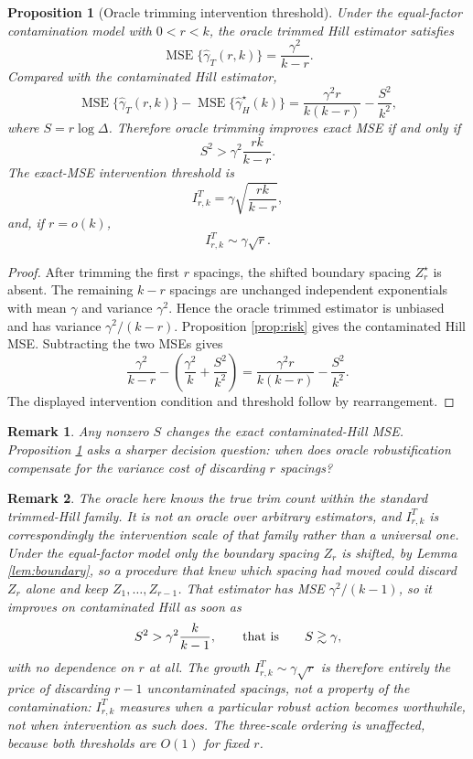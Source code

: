 \documentclass[11pt]{article}
\newtheorem{proposition}{Proposition}
\newtheorem{remark}{Remark}
\newcommand{\ghat}{\widehat{\gamma}}
\begin{document}
\begin{proposition}[Oracle trimming intervention threshold]
\label{prop:oracle-intervention}
Under the equal-factor contamination model with $0<r<k$, the oracle trimmed
Hill estimator satisfies
\[
  \operatorname{MSE}\{\ghat_T(r,k)\}
  =
  \frac{\gamma^2}{k-r}.
\]
Compared with the contaminated Hill estimator,
\[
  \operatorname{MSE}\{\ghat_T(r,k)\}
  -
  \operatorname{MSE}\{\ghat_H^\star(k)\}
  =
  \frac{\gamma^2r}{k(k-r)}
  -
  \frac{S^2}{k^2},
\]
where $S=r\log\Delta$.  Therefore oracle trimming improves exact MSE if and
only if
\[
  S^2>\gamma^2\frac{rk}{k-r}.
\]
The exact-MSE intervention threshold is
\[
  I^{T}_{r,k}
  =
  \gamma\sqrt{\frac{rk}{k-r}},
\]
and, if $r=o(k)$,
\[
  I^{T}_{r,k}\sim\gamma\sqrt r.
\]
\end{proposition}

\begin{proof}
After trimming the first $r$ spacings, the shifted boundary spacing
$Z_r^\star$ is absent.  The remaining $k-r$ spacings are unchanged independent
exponentials with mean $\gamma$ and variance $\gamma^2$.  Hence the oracle
trimmed estimator is unbiased and has variance $\gamma^2/(k-r)$.  Proposition
\ref{prop:risk} gives the contaminated Hill MSE.  Subtracting the two MSEs
gives
\[
  \frac{\gamma^2}{k-r}
  -
  \left(
    \frac{\gamma^2}{k}
    +
    \frac{S^2}{k^2}
  \right)
  =
  \frac{\gamma^2r}{k(k-r)}
  -
  \frac{S^2}{k^2}.
\]
The displayed intervention condition and threshold follow by rearrangement.
\end{proof}

\begin{remark}
Any nonzero $S$ changes the exact contaminated-Hill MSE.  Proposition
\ref{prop:oracle-intervention} asks a sharper decision question: when does
oracle robustification compensate for the variance cost of discarding $r$
spacings?
\end{remark}

\begin{remark}
\label{rem:trim-oracle}
The oracle here knows the true trim count within the standard trimmed-Hill
family.  It is not an oracle over arbitrary estimators, and $I^{T}_{r,k}$ is
correspondingly the intervention scale of that family rather than a universal
one.  Under the equal-factor model only the boundary spacing $Z_{r}$ is
shifted, by Lemma \ref{lem:boundary}, so a procedure that knew which spacing
had moved could discard $Z_{r}$ alone and keep $Z_1,\ldots,Z_{r-1}$.  That
estimator has MSE $\gamma^2/(k-1)$, so it improves on contaminated Hill as soon
as
\[
  S^2>\gamma^2\frac{k}{k-1},
  \qquad\hbox{that is}\qquad
  S\gtrsim\gamma,
\]
with no dependence on $r$ at all.  The growth $I^{T}_{r,k}\sim\gamma\sqrt r$
is therefore entirely the price of discarding $r-1$ uncontaminated spacings,
not a property of the contamination: $I^{T}_{r,k}$ measures when a particular
robust action becomes worthwhile, not when intervention as such does.  The
three-scale ordering is unaffected, because both thresholds are $O(1)$ for
fixed $r$.
\end{remark}
\end{document}
